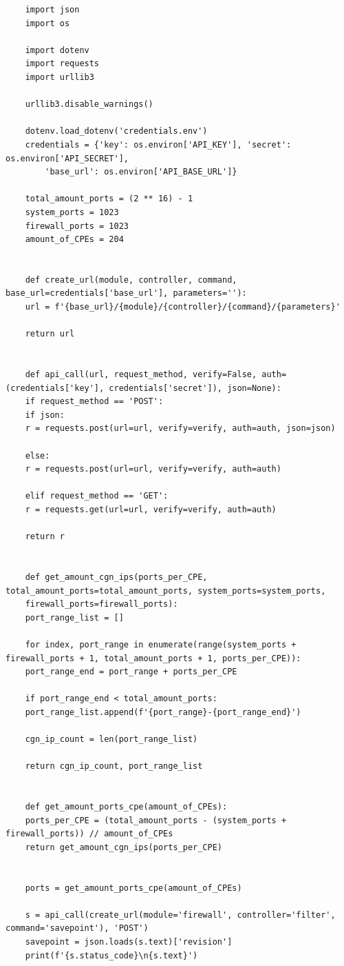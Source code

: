 \begin{verbatim}
    import json
    import os

    import dotenv
    import requests
    import urllib3

    urllib3.disable_warnings()

    dotenv.load_dotenv('credentials.env')
    credentials = {'key': os.environ['API_KEY'], 'secret': os.environ['API_SECRET'],
        'base_url': os.environ['API_BASE_URL']}

    total_amount_ports = (2 ** 16) - 1
    system_ports = 1023
    firewall_ports = 1023
    amount_of_CPEs = 204


    def create_url(module, controller, command, base_url=credentials['base_url'], parameters=''):
    url = f'{base_url}/{module}/{controller}/{command}/{parameters}'

    return url


    def api_call(url, request_method, verify=False, auth=(credentials['key'], credentials['secret']), json=None):
    if request_method == 'POST':
    if json:
    r = requests.post(url=url, verify=verify, auth=auth, json=json)

    else:
    r = requests.post(url=url, verify=verify, auth=auth)

    elif request_method == 'GET':
    r = requests.get(url=url, verify=verify, auth=auth)

    return r


    def get_amount_cgn_ips(ports_per_CPE, total_amount_ports=total_amount_ports, system_ports=system_ports,
    firewall_ports=firewall_ports):
    port_range_list = []

    for index, port_range in enumerate(range(system_ports + firewall_ports + 1, total_amount_ports + 1, ports_per_CPE)):
    port_range_end = port_range + ports_per_CPE

    if port_range_end < total_amount_ports:
    port_range_list.append(f'{port_range}-{port_range_end}')

    cgn_ip_count = len(port_range_list)

    return cgn_ip_count, port_range_list


    def get_amount_ports_cpe(amount_of_CPEs):
    ports_per_CPE = (total_amount_ports - (system_ports + firewall_ports)) // amount_of_CPEs
    return get_amount_cgn_ips(ports_per_CPE)


    ports = get_amount_ports_cpe(amount_of_CPEs)

    s = api_call(create_url(module='firewall', controller='filter', command='savepoint'), 'POST')
    savepoint = json.loads(s.text)['revision']
    print(f'{s.status_code}\n{s.text}')


\end{verbatim}
